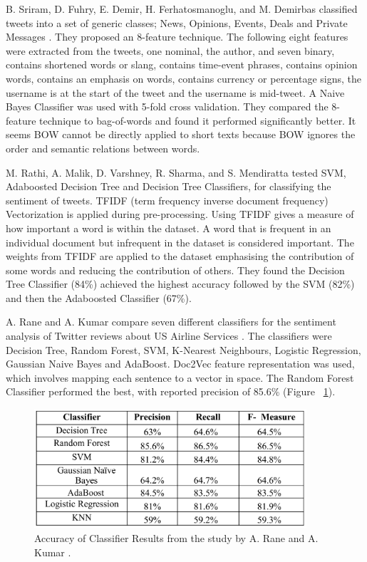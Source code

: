 B. Sriram, D. Fuhry, E. Demir, H. Ferhatosmanoglu, and M. Demirbas classified tweets into a set of generic classes; News, Opinions, Events, Deals and Private Messages \cite{sriram2010}. They proposed an 8-feature technique. The following eight features were extracted from the tweets, one nominal, the author, and seven binary, contains shortened words or slang, contains time-event phrases, contains opinion words, contains an emphasis on words, contains currency or percentage signs, the username is at the start of the tweet and the username is mid-tweet. A Naive Bayes Classifier was used with 5-fold cross validation. They compared the 8-feature technique to bag-of-words and found it performed significantly better. It seems BOW cannot be directly applied to short texts because BOW ignores the order and semantic relations between words.

M. Rathi, A. Malik, D. Varshney, R. Sharma, and S. Mendiratta \cite{Raithi2018} tested SVM, Adaboosted Decision Tree and Decision Tree Classifiers, for classifying the sentiment of tweets. TFIDF (term frequency inverse document frequency) Vectorization is applied during pre-processing. Using TFIDF gives a measure of how important a word is within the dataset. A word that is frequent in an individual document but infrequent in the dataset is considered important. The weights from TFIDF are applied to the dataset emphasising the contribution of some words and reducing the contribution of others. They found the Decision Tree Classifier (84\%) achieved the highest accuracy followed by the SVM (82\%) and then the Adaboosted Classifier (67\%). 

A. Rane and A. Kumar compare seven different classifiers for the sentiment analysis of Twitter reviews about US Airline Services \cite{Rane2018}. The classifiers were Decision Tree, Random Forest, SVM, K-Nearest Neighbours, Logistic Regression, Gaussian Naive Bayes and AdaBoost. Doc2Vec feature representation was used, which involves mapping each sentence to a vector in space. The Random Forest Classifier performed the best, with reported precision of 85.6\% (Figure ~\ref{fig:arane}). 

\begin{figure}[h!]
\centering
\includegraphics[width=0.9\textwidth]{literature_review/arane_classifier_results.PNG}
\caption{\label{fig:arane} Accuracy of Classifier Results from the study by A. Rane and A. Kumar \cite{Rane2018}.}
\end{figure}

